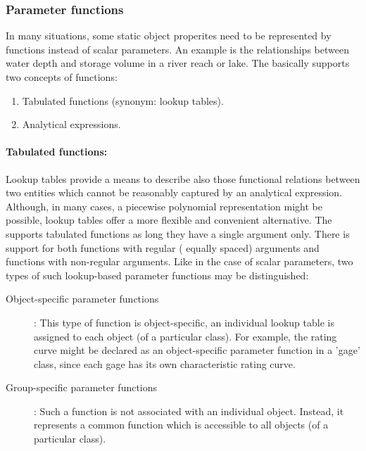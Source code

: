 \subsubsection*{Parameter functions} \label{sec:concept-classFeatures-paramsFun}

In many situations, some static object properites need to be represented by functions instead of scalar parameters. An example is the relationships between water depth and storage volume in a river reach or lake. The  basically supports two concepts of functions:
\begin{enumerate}
  \item Tabulated functions (synonym: lookup tables).
  \item Analytical expressions.
\end{enumerate}

\paragraph{Tabulated functions:} Lookup tables provide a means to describe also those functional relations between two entities which cannot be reasonably captured by an analytical expression. Although, in many cases, a piecewise polynomial representation might be possible, lookup tables offer a more flexible and convenient alternative. The  supports tabulated functions as long they have a single argument only. There is support for both functions with regular (\ie{} equally spaced) arguments and functions with non-regular arguments. Like in the case of scalar parameters, two types of such lookup-based parameter functions may be distinguished:

\begin{description}
  \item [Object-specific parameter functions]: This type of function is object-specific, \ie{} an individual lookup table is assigned to each object (of a particular class). For example, the rating curve might be declared as an object-specific parameter function in a 'gage' class, since each gage has its own characteristic rating curve.
  \item [Group-specific parameter functions]: Such a function is not associated with an individual object. Instead, it represents a common function which is accessible to all objects (of a particular class).
\end{description}


